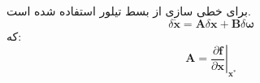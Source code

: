برای خطی سازی از بسط تیلور استفاده شده ‌است.
\begin{equation}
	\delta \dot{\boldsymbol{x}} = \boldsymbol A\delta \boldsymbol x + \boldsymbol B \delta \boldsymbol \omega 
\end{equation}
که:
\begin{equation}
	\boldsymbol A = \left.\dfrac{\partial \boldsymbol f}{\partial  \boldsymbol x}\right\vert_{\boldsymbol{x^*}} 
\end{equation}
